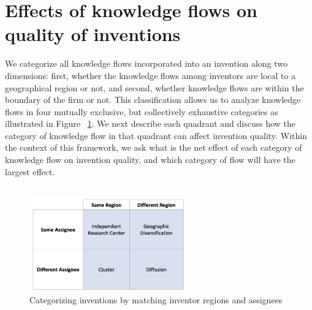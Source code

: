 \documentclass[10pt,letterpaper]{article}
\begin{document}
\section*{Effects of knowledge flows on quality of inventions}
We categorize all knowledge flows incorporated into an invention along two dimensions:  first, whether the knowledge flows among inventors are local to a geographical region or not, and second, whether knowledge flows are within the boundary of the firm or not. This classification allows us to analyze knowledge flows in four mutually exclusive, but collectively exhaustive categories as illustrated in Figure ~\ref{fig:2x2}. We next describe each quadrant and discuss how the category of knowledge flow in that quadrant can affect invention quality. Within the context of this framework, we ask what is the net effect of each category of knowledge flow on invention quality, and which category of flow will have the largest effect.
\\\\
\begin{figure}[h]
\begin{centering}
  \includegraphics[width=0.6\textwidth]{2x2}
  \caption{Categorizing inventions by matching inventor regions and assignees}
  \label{fig:2x2}
\end{centering}
\end{figure}
\end{document}
